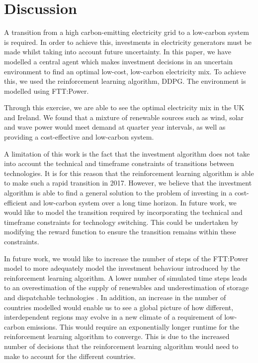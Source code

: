 \documentclass{article}
\begin{document}


\section{Discussion}

A transition from a high carbon-emitting electricity grid to a low-carbon system is required. In order to achieve this, investments in electricity generators must be made whilst taking into account future uncertainty. In this paper, we have modelled a central agent which makes investment decisions in an uncertain environment to find an optimal low-cost, low-carbon electricity mix. To achieve this, we used the reinforcement learning algorithm, DDPG. The environment is modelled using FTT:Power.

Through this exercise, we are able to see the optimal electricity mix in the UK and Ireland. We found that a mixture of renewable sources such as wind, solar and wave power would meet demand at quarter year intervals, as well as providing a cost-effective and low-carbon system.

A limitation of this work is the fact that the investment algorithm does not take into account the technical and timeframe constraints of transitions between technologies. It is for this reason that the reinforcement learning algorithm is able to make such a rapid transition in 2017. However, we believe that the investment algorithm is able to find a general solution to the problem of investing in a cost-efficient and low-carbon system over a long time horizon. In future work, we would like to model the transition required by incorporating the technical and timeframe constraints for technology switching. This could be undertaken by modifying the reward function to ensure the transition remains within these constraints.


In future work, we would like to increase the number of steps of the FTT:Power model to more adequately model the investment behaviour introduced by the reinforcement learning algorithm. A lower number of simulated time steps leads to an overestimation of the supply of renewables and underestimation of storage and dispatchable technologies \cite{Ludig2011}. In addition, an increase in the number of countries modelled would enable us to see a global picture of how different, interdependent regions may evolve in a new climate of a requirement of low-carbon emissions. This would require an exponentially longer runtime for the reinforcement learning algorithm to converge. This is due to the increased number of decisions that the reinforcement learning algorithm would need to make to account for the different countries. 
\end{document}
